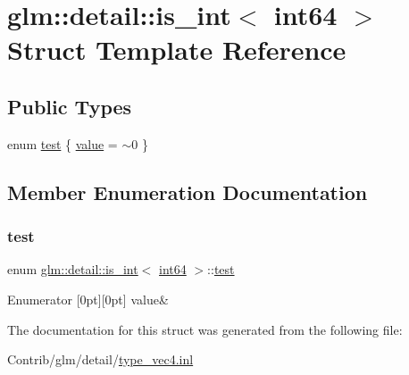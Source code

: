 \hypertarget{structglm_1_1detail_1_1is__int_3_01int64_01_4}{}\section{glm\+:\+:detail\+:\+:is\+\_\+int$<$ int64 $>$ Struct Template Reference}
\label{structglm_1_1detail_1_1is__int_3_01int64_01_4}
\subsection*{Public Types}
\begin{DoxyCompactItemize}
\item 
enum \mbox{\hyperlink{structglm_1_1detail_1_1is__int_3_01int64_01_4_a6d738b326fc92804b0cffae571ac3e7f}{test}} \{ \mbox{\hyperlink{structglm_1_1detail_1_1is__int_3_01int64_01_4_a6d738b326fc92804b0cffae571ac3e7fa143df02d7060f75928a631355c601c08}{value}} = $\sim$0
 \}
\end{DoxyCompactItemize}


\subsection{Member Enumeration Documentation}
\mbox{\label{structglm_1_1detail_1_1is__int_3_01int64_01_4_a6d738b326fc92804b0cffae571ac3e7f}} 
\subsubsection{\texorpdfstring{test}{test}}
{\footnotesize\ttfamily enum \mbox{\hyperlink{structglm_1_1detail_1_1is__int}{glm\+::detail\+::is\+\_\+int}}$<$ \mbox{\hyperlink{namespaceglm_1_1detail_a5b1c3227ec636c24a0676746381adfc8}{int64}} $>$\+::\mbox{\hyperlink{structglm_1_1detail_1_1is__int_3_01int64_01_4_a6d738b326fc92804b0cffae571ac3e7f}{test}}}

\begin{DoxyEnumFields}{Enumerator}
[0pt][0pt]{}\mbox{\label{structglm_1_1detail_1_1is__int_3_01int64_01_4_a6d738b326fc92804b0cffae571ac3e7fa143df02d7060f75928a631355c601c08}} 
value&\\
\hline

\end{DoxyEnumFields}


The documentation for this struct was generated from the following file\+:\begin{DoxyCompactItemize}
\item 
Contrib/glm/detail/\mbox{\hyperlink{type__vec4_8inl}{type\+\_\+vec4.\+inl}}\end{DoxyCompactItemize}
